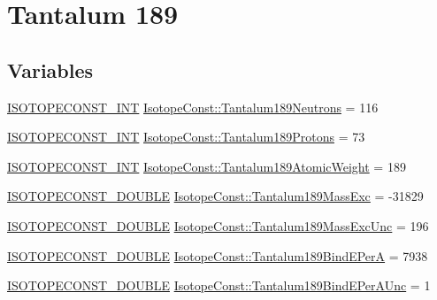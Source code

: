 \hypertarget{group___isotope_const-_tantalum-_ta189}{}\section{Tantalum 189}
\label{group___isotope_const-_tantalum-_ta189}
\subsection*{Variables}
\begin{DoxyCompactItemize}
\item 
\mbox{\hyperlink{group___isotope_const-_macros_ga5f18360b3e99483a35c32d789e62621c}{I\+S\+O\+T\+O\+P\+E\+C\+O\+N\+S\+T\+\_\+\+I\+NT}} \mbox{\hyperlink{group___isotope_const-_tantalum-_ta189_gab7aae6b70fcade9e9dac8dedadf05358}{Isotope\+Const\+::\+Tantalum189\+Neutrons}} = 116
\item 
\mbox{\hyperlink{group___isotope_const-_macros_ga5f18360b3e99483a35c32d789e62621c}{I\+S\+O\+T\+O\+P\+E\+C\+O\+N\+S\+T\+\_\+\+I\+NT}} \mbox{\hyperlink{group___isotope_const-_tantalum-_ta189_gaf7fa664d95888b0e964e16b9ed4fc1b9}{Isotope\+Const\+::\+Tantalum189\+Protons}} = 73
\item 
\mbox{\hyperlink{group___isotope_const-_macros_ga5f18360b3e99483a35c32d789e62621c}{I\+S\+O\+T\+O\+P\+E\+C\+O\+N\+S\+T\+\_\+\+I\+NT}} \mbox{\hyperlink{group___isotope_const-_tantalum-_ta189_gadbffca15945c8090b56532016caaa7b3}{Isotope\+Const\+::\+Tantalum189\+Atomic\+Weight}} = 189
\item 
\mbox{\hyperlink{group___isotope_const-_macros_ga8f45a7272ce02c0b4c65c44636ed719a}{I\+S\+O\+T\+O\+P\+E\+C\+O\+N\+S\+T\+\_\+\+D\+O\+U\+B\+LE}} \mbox{\hyperlink{group___isotope_const-_tantalum-_ta189_ga3fe05112cd441eb26b385f8dd82c5c62}{Isotope\+Const\+::\+Tantalum189\+Mass\+Exc}} = -\/31829
\item 
\mbox{\hyperlink{group___isotope_const-_macros_ga8f45a7272ce02c0b4c65c44636ed719a}{I\+S\+O\+T\+O\+P\+E\+C\+O\+N\+S\+T\+\_\+\+D\+O\+U\+B\+LE}} \mbox{\hyperlink{group___isotope_const-_tantalum-_ta189_ga9eefdbcdd450fb5c732c46bc7afbb259}{Isotope\+Const\+::\+Tantalum189\+Mass\+Exc\+Unc}} = 196
\item 
\mbox{\hyperlink{group___isotope_const-_macros_ga8f45a7272ce02c0b4c65c44636ed719a}{I\+S\+O\+T\+O\+P\+E\+C\+O\+N\+S\+T\+\_\+\+D\+O\+U\+B\+LE}} \mbox{\hyperlink{group___isotope_const-_tantalum-_ta189_ga6e89119f9ed0fe310612679a33b6ed39}{Isotope\+Const\+::\+Tantalum189\+Bind\+E\+PerA}} = 7938
\item 
\mbox{\hyperlink{group___isotope_const-_macros_ga8f45a7272ce02c0b4c65c44636ed719a}{I\+S\+O\+T\+O\+P\+E\+C\+O\+N\+S\+T\+\_\+\+D\+O\+U\+B\+LE}} \mbox{\hyperlink{group___isotope_const-_tantalum-_ta189_ga1e38bb419af6bae6ea59ec252e206d70}{Isotope\+Const\+::\+Tantalum189\+Bind\+E\+Per\+A\+Unc}} = 1

\end{DoxyCompactItemize}
